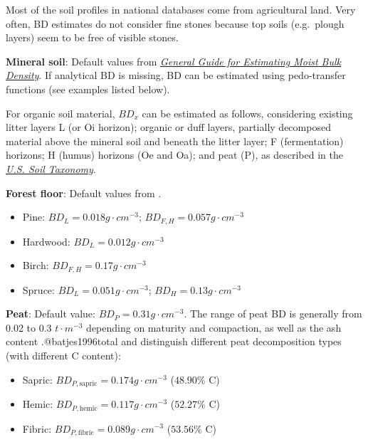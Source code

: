 \documentclass[10pt,b5paper,]{book}
\theoremstyle{definition}
\theoremstyle{definition}
\theoremstyle{definition}
\theoremstyle{remark}
\begin{document}
Most of the soil profiles in national databases come from agricultural
land. Very often, BD estimates do not consider fine stones because top
soils (e.g.~plough layers) seem to be free of visible stones.

\textbf{Mineral soil}: Default values from
\href{https://www.nrcs.usda.gov/wps/portal/nrcs/detail/soils/survey/office/ssr10/tr/?cid=nrcs144p2_074844}{\emph{General
Guide for Estimating Moist Bulk Density}}. If analytical BD is missing,
BD can be estimated using pedo-transfer functions (see examples listed
below).

For organic soil material, \(BD_x\) can be estimated as follows,
considering existing litter layers L (or Oi horizon); organic or duff
layers, partially decomposed material above the mineral soil and beneath
the litter layer; F (fermentation) horizons; H (humus) horizons (Oe and
Oa); and peat (P), as described in the
\href{https://www.nrcs.usda.gov/Internet/FSE_DOCUMENTS/nrcs142p2_051232.pdf}{\emph{U.S.
Soil Taxonomy}}.

\textbf{Forest floor}: Default values from \citet{ottmar_litter_2007}.

\begin{itemize}
\item
  Pine: \(BD_{L} = 0.018 g \cdot cm^{-3}\);
  \(BD_{F,H} = 0.057 g \cdot cm^{-3}\)
\item
  Hardwood: \(BD_{L} = 0.012 g \cdot cm^{-3}\)
  \citep{barney_forest_1981}
\item
  Birch: \(BD_{F,H} = 0.17 g \cdot cm^{-3}\)
\item
  Spruce: \(BD_{L} = 0.051 g \cdot cm^{-3}\);
  \(BD_{H}= 0.13 g \cdot cm^{-3}\)
\end{itemize}

\textbf{Peat}: Default value: \(BD_{P} = 0.31 g \cdot cm^{-3}\). The
range of peat BD is generally from 0.02 to 0.3 \(t \cdot m^{-3}\)
depending on maturity and compaction, as well as the ash content
\citep{agus_measuring_2011}.@batjes1996total and
\citet{agus_measuring_2011} distinguish different peat decomposition
types (with different C content):

\begin{itemize}
\item
  Sapric: \(BD_{P,\text{sapric}} = 0.174 g \cdot cm^{-3}\) (\(48.90\%\)
  C)
\item
  Hemic: \(BD_{P,\text{hemic}} = 0.117 g \cdot cm^{-3}\) (\(52.27\%\) C)
\item
  Fibric: \(BD_{P,\text{fibric}} = 0.089 g \cdot cm^{-3}\) (\(53.56\%\)
  C)
\end{itemize}
\end{document}
